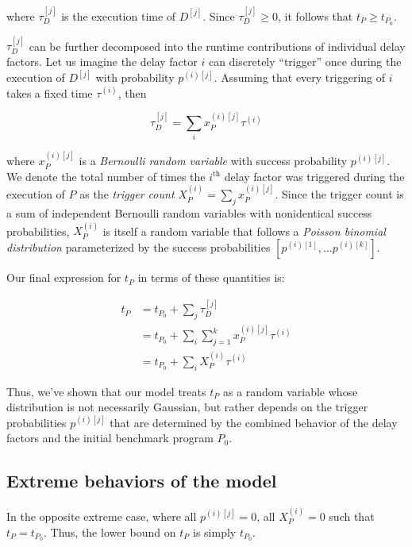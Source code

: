 \documentclass[conference]{IEEEtran}
\begin{document}
where $\tau^{[j]}_D$ is the execution time of $D^{[j]}$. Since $\tau^{[j]}_D \ge 0$, it
follows that $t_P \ge t_{P_0}$.

$\tau^{[j]}_D$ can be further decomposed into the runtime contributions of individual delay
factors. Let us imagine the delay factor $i$ can discretely ``trigger'' once during the
execution of $D^{[j]}$ with probability $p^{(i)[j]}$. Assuming that every triggering of $i$
takes a fixed time $\tau^{(i)}$, then

\begin{equation}
    \tau^{[j]}_D = \sum_{i} x_P^{(i)[j]} \tau^{(i)}
\end{equation}

where $x_P^{(i)[j]}$ is a \textit{Bernoulli random variable} with success probability
$p^{(i)[j]}$. We denote the total number of times the $i^{\textrm{th}}$ delay factor was
triggered during the execution of $P$ as the \textit{trigger count} $X_P^{(i)} = \sum_{j}
x_P^{(i)[j]}$. Since the trigger count is a sum of independent Bernoulli random variables with
nonidentical success probabilities, $X_P^{(i)}$ is itself a random variable that follows a
\textit{Poisson binomial distribution} parameterized by the success probabilities
$\left[p^{(i)[1]}, \dots p^{(i)[k]}\right]$.

Our final expression for $t_P$ in terms of these quantities is:

\begin{align}
t_P &= t_{P_0} + \sum_{j} \tau^{[j]}_D \\ \nonumber
    &= t_{P_0} + \sum_{i} \sum_{j=1}^{k} x_P^{(i)[j]} \tau^{(i)} \\ \nonumber
    &= t_{P_0} + \sum_{i} X_P^{(i)} \tau^{(i)}
\end{align}

Thus, we've shown that our model treats $t_P$ as a random variable whose distribution is not
necessarily Gaussian, but rather depends on the trigger probabilities $p^{(i)[j]}$ that are
determined by the combined behavior of the delay factors and the initial benchmark program
$P_0$.

\subsection{Extreme behaviors of the model}



In the opposite extreme case, where all $p^{(i)[j]} = 0$, all $X_P^{(i)} = 0$ such that $t_P =
t_{P_0}$. Thus, the lower bound on $t_P$ is simply $t_{P_0}$.
\end{document}

